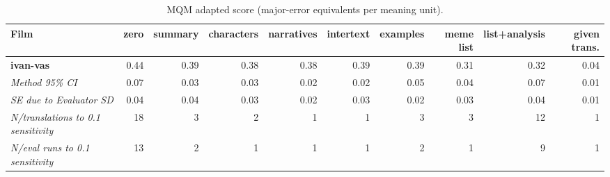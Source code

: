 \begin{table}[ht]
\centering
\begin{adjustbox}{width=\textwidth}
\begin{tabular}{lrrrrrrrr|r}
Film & zero & summary & characters & narratives & intertext & examples & meme list & list+analysis & given trans. \\
\hline
\textbf{ivan-vas} & 0.44 & 0.39 & 0.38 & 0.38 & 0.39 & 0.39 & 0.31 & 0.32 & 0.04 \\

\emph{Method 95\% CI} & 0.07 & 0.03 & 0.03 & 0.02 & 0.02 & 0.05 & 0.04 & 0.07 & 0.01 \\

\emph{SE due to Evaluator SD} & 0.04 & 0.04 & 0.03 & 0.02 & 0.03 & 0.02 & 0.03 & 0.04 & 0.01 \\

\emph{N/translations to 0.1 sensitivity} & 18 & 3 & 2 & 1 & 1 & 3 & 3 & 12 & 1 \\

\emph{N/eval runs to 0.1 sensitivity} & 13 & 2 & 1 & 1 & 1 & 2 & 1 & 9 & 1 \\

\hline
\end{tabular}
\end{adjustbox}
\caption{MQM adapted score (major-error equivalents per meaning unit).}
\label{tab:mqm-method-comparison}
\end{table}

